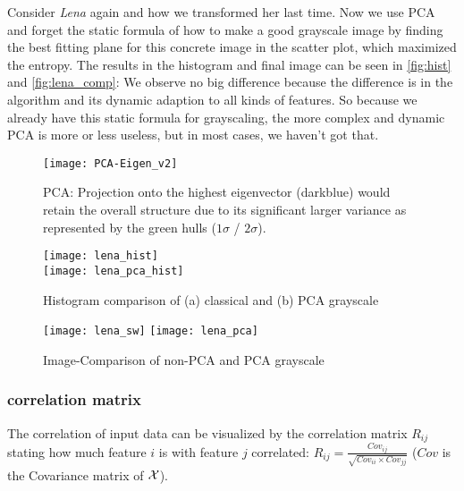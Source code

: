\documentclass[dvipsnames,twocolumn]{scrartcl}
\begin{document}
	Consider \emph{Lena} again and how we transformed her last time. Now we use PCA and forget the static formula of how to make a good grayscale image by finding the best fitting plane for this concrete image in the scatter plot, which maximized the entropy. The results in the histogram and final image can be seen in \autoref{fig:hist} and \autoref{fig:lena_comp}: We observe no big difference because the difference is in the algorithm and its dynamic adaption to all kinds of features. So because we already have this static formula for grayscaling, the more complex and dynamic PCA is more or less useless, but in most cases, we haven't got that.
	
	\begin{figure}
		\caption{PCA: Projection onto the highest eigenvector (darkblue) would retain the overall structure due to its significant larger variance as represented by the green hulls ($1\sigma$ / $2\sigma$).}
		\label{fig:PCA_exp}
		\texttt{[image: PCA-Eigen\_v2]}
	\end{figure}
	
	\begin{figure}
		\begin{center}
			\caption{Histogram comparison of (a) classical and (b) PCA grayscale}
			\label{fig:hist}
			\texttt{[image: lena\_hist]}\\
			\texttt{[image: lena\_pca\_hist]}
		\end{center}
	\end{figure}
	
	\begin{figure}
		\begin{center}
			\caption{Image-Comparison of non-PCA and PCA grayscale}
			\label{fig:lena_comp}
			\texttt{[image: lena\_sw]}
			\texttt{[image: lena\_pca]}
		\end{center}
	\end{figure}
	
	\subsubsection{correlation matrix}
	
	The correlation of input data can be visualized by the correlation matrix $R_{ij}$ stating how much feature $i$ is with feature $j$ correlated: $R_{ij} = \frac{Cov_{ij}}{\sqrt{Cov_{ii}\times Cov_{jj}}}$ ($Cov$ is the Covariance matrix of $\cal X$).
	
\end{document}
